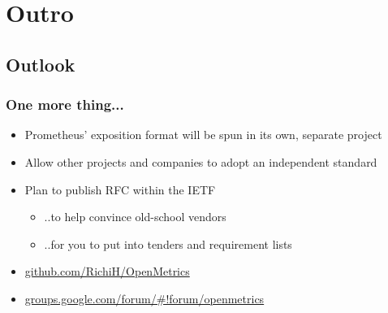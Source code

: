 \documentclass[t]{beamer}
\begin{document}
\section{Outro}


\subsection{Outlook}


%
\begin{frame}
	\frametitle{One more thing...}
	\begin{itemize}
		\item Prometheus' exposition format will be spun in its own, separate project
		\item Allow other projects and companies to adopt an independent standard
		\item Plan to publish RFC within the IETF
		\begin{itemize}
			\item ..to help convince old-school vendors
			\item ..for you to put into tenders and requirement lists
		\end{itemize}
		\item \url{github.com/RichiH/OpenMetrics}
		\item \url{groups.google.com/forum/\#!forum/openmetrics}
	\end{itemize}
\end{frame}



\end{document}
